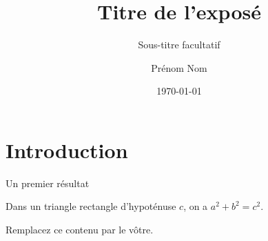 \documentclass{BeamerJS}
\title{Titre de l'exposé}
\subtitle{Sous-titre facultatif}
\author{Prénom Nom}
\date{\today}
\begin{document}
\begin{frame}
	\titlepage
\end{frame}

\section{Introduction}

\begin{frame}{Un premier résultat}
	\begin{thm}[Pythagore]
		Dans un triangle rectangle d'hypoténuse $c$, on a $a^2+b^2=c^2$.
	\end{thm}

	\begin{apoint}
		Remplacez ce contenu par le vôtre.
	\end{apoint}
\end{frame}
\end{document}
